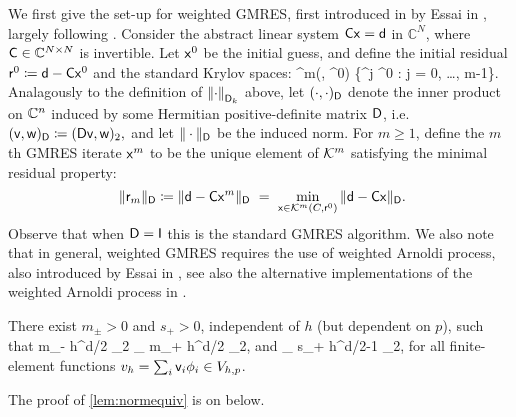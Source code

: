We first give the set-up for weighted GMRES, first introduced in by Essai in \cite{Es:98}, largely following \cite[Section 5]{GrSpVa:17}. Consider the abstract  linear system 
$\mathsf{C} \mathsf{x} = \mathsf{d}$
in $\mathbb{C}^N$, where $\mathsf{C} \in \mathbb C^{N\times N}$ is invertible. Let $\mathsf{x}^{0}$ be the initial guess, and define the initial residual $\mathsf{r}^0 \coloneqq \mathsf{d}- \mathsf{C} \mathsf{x}^0$ and the standard Krylov spaces:  
\beqs  
\cK^m(\Cmat, \rvec^0) \de {}\big\{\matrixC^j \rvec^0 : j = 0, \ldots, m-1\big\}.
\eeqs
Analagously to the definition of $\NDk{\cdot}$ above, let $(\cdot , \cdot )_{\mathsf{D}}$ denote the inner product on $\mathbb C^n$ 
induced by some Hermitian positive-definite matrix $\mathsf{D}$, i.e.~
$(\mathsf{v},\mathsf{w})_{\mathsf{D}} \coloneqq (\mathsf{D} \mathsf{v}, \mathsf{w})_2,$
and let $\Vert \cdot \Vert_{\mathsf{D}}$ be the induced norm. For $m \geq 1$, define the $m$th GMRES iterate $\mathsf{x}^m$  to be  the unique element of $\mathcal K^m$ satisfying  the  
 minimal residual  property: 
$$ \ \Vert \rvecm \Vert_\Dmat \de \Vert \dvec - \matrixC \xvec^m \Vert_\Dmat \ = \ \min_{\xvec \in \cK^m(C, \rvec^0)} \Vert {\dvec} - {\matrixC} {\xvec} \Vert_\Dmat. $$
Observe that when $\mathsf{D} = \mathsf{I}$ this is the standard GMRES algorithm. We also note that in general, weighted GMRES requires the use of weighted Arnoldi process, also introduced by Essai in \cite{Es:98}, see also the alternative implementations of the weighted Arnoldi process in \cite{GuPe:14}.

\label{lem:normequiv}
There exist $m_\pm >0$ and $s_+>0$, independent of $h$ (but dependent on $p$), such that
\beq\label{eq:normequiv1}
m_- h^{d/2} \N{\vvec}_2 \leq {}_{\LtD} \leq m_+ h^{d/2} \N{\vvec}_2,
\eeq
and
\beq\label{eq:normequiv2}
_{\LtD} \leq s_+ h^{d/2-1} \N{\vvec}_2,
\eeq
for all finite-element functions $v_h =\sum_i \mathsf{v}_i \phi_i \in V_{h,p}$.
\ele

The proof of \cref{lem:normequiv} is on  below.


